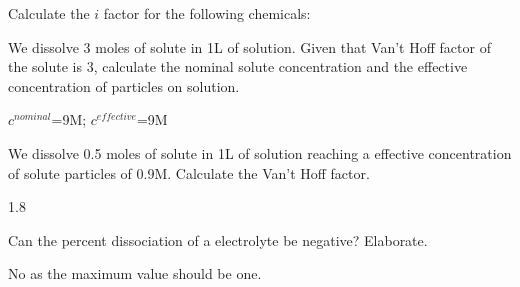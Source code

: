 \documentclass[main.tex]{subfiles}
\begin{document}
\begin{multicols*}{2}
\begin{question}[ID=\the\value{numA}]
Calculate the $i$ factor for the following chemicals:
\begin{inparaenum}[(a)]
\item   {}  %
\item   {}  %
\item   {}  %
\end{inparaenum}
\end{question}
\begin{solution}
\begin{inparaenum}[(a)]
\item   {}  %
\item   {}  %
\item   {}  %
 \end{inparaenum}\hspace{0.1cm}\end{solution}%



\begin{question}[ID=\the\value{numA}]
We dissolve 3 moles of solute in 1L of solution. Given that Van't Hoff factor of the solute is 3, calculate the nominal solute concentration and the effective concentration of particles on solution.  
\end{question}
\begin{solution}
$c^{nominal}$=9M; $c^{effective}$=9M
\hspace{0.1cm}\end{solution}%


\begin{question}[ID=\the\value{numA}]
We dissolve 0.5 moles of solute in 1L of solution reaching a effective concentration of solute particles of 0.9M. Calculate the Van't Hoff factor.
\end{question}
\begin{solution}
1.8
\hspace{0.1cm}\end{solution}%


\begin{question}[ID=\the\value{numA}]
Can the percent dissociation of a electrolyte be negative? Elaborate.
\end{question}
\begin{solution}
No as the maximum value should be one.
\hspace{0.1cm}\end{solution}%


\end{multicols*}
\end{document}
